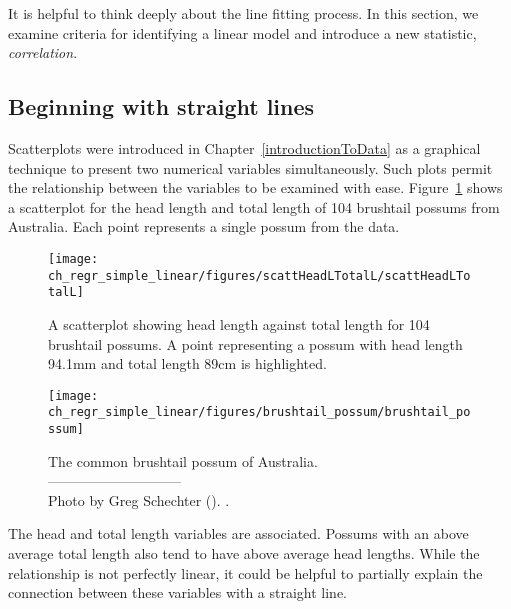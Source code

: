 It is helpful to think deeply about the line fitting process. In this section, we examine criteria for identifying a linear model and introduce a new statistic, \emph{correlation}.

\subsection{Beginning with straight lines}


Scatterplots were introduced in Chapter~\ref{introductionToData} as a graphical technique to present two numerical variables simultaneously. Such plots permit the relationship between the variables to be examined with ease. Figure~\ref{scattHeadLTotalL} shows a scatterplot for the head length and total length of 104 brushtail possums from Australia. Each point represents a single possum from the data.

\begin{figure}
   \centering
   \texttt{[image: ch\_regr\_simple\_linear/figures/scattHeadLTotalL/scattHeadLTotalL]}
   \caption{A scatterplot showing head length against total length for 104 brushtail possums. A point representing a possum with head length 94.1mm and total length 89cm is highlighted.}
   \label{scattHeadLTotalL}
\end{figure}

\setlength{\captionwidth}{0.83\mycaptionwidth}
\begin{figure}
   \centering
   \texttt{[image: ch\_regr\_simple\_linear/figures/brushtail\_possum/brushtail\_possum]}
   \caption{The common brushtail possum of Australia.\vspace{-1mm} \\
   -----------------------------\vspace{-2mm}\\
   {\footnotesize Photo by Greg Schechter (). .}\vspace{-8mm}}
   \label{brushtail_possum}
\end{figure}
\setlength{\captionwidth}{\mycaptionwidth}

The head and total length variables are associated. Possums with an above average total length also tend to have above average head lengths. While the relationship is not perfectly linear, it could be helpful to partially explain the connection between these variables with a straight line.

